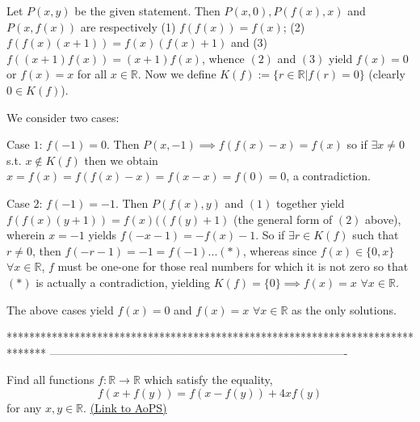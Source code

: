 \begin{solution}
	Let $P(x,y)$ be the given statement. Then $P(x,0), P(f(x),x)$ and $P(x,f(x))$ are respectively (1) $f(f(x))=f(x)$; (2) $f(f(x)(x+1)) = f(x)(f(x)+1)$ and (3) $f((x+1)f(x)) = (x+1)f(x)$, whence $(2)$ and $(3)$ yield $f(x) = 0$ or $f(x)=x$ for all $x \in \mathbb{R}$. Now we define $K(f) := \{r \in \mathbb{R}| f(r)=0\}$ (clearly $0 \in K(f)$). 

We consider two cases:

Case $1$: $f(-1)=0$. Then $P(x,-1) \implies f(f(x)-x)=f(x)$ so if $\exists x \neq 0$ s.t. $x \not\in K(f)$ then we obtain $x=f(x)=f(f(x)-x)=f(x-x)=f(0)=0$, a contradiction.

Case $2$: $f(-1)=-1$. Then $P(f(x),y)$ and $(1)$ together yield $f(f(x)(y+1)) = f(x)((f(y)+1)$ (the general form of $(2)$ above), wherein $x=-1$ yields $f(-x-1)=-f(x)-1$. So if $\exists r \in K(f)$ such that $r \neq 0$, then $f(-r-1)=-1=f(-1)   ...(*)$, whereas since $f(x) \in \{0, x\}$ $\forall x \in \mathbb{R}$, $f$ must be one-one for those real numbers for which it is not zero so that $(*)$ is actually a contradiction, yielding $K(f)=\{ 0 \} \implies f(x)=x$ $\forall x \in \mathbb{R}$.

The above cases yield $f(x) = 0$ and $f(x)=x$ $\forall x \in \mathbb{R}$ as the only solutions.

\end{solution}
*******************************************************************************
-------------------------------------------------------------------------------

\begin{problem}
	Find all functions $f:\mathbb{R}\rightarrow\mathbb{R}$ which satisfy the equality,
\[f(x+f(y))=f(x-f(y))+4xf(y)\]
for any $x,y\in\mathbb{R}$.
	\flushright \href{https://artofproblemsolving.com/community/c6h386820}{(Link to AoPS)}
\end{problem}



